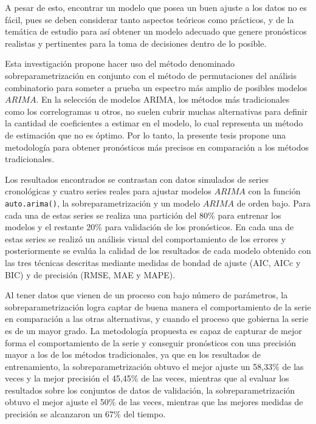 \documentclass[
]{article}
\begin{document}
A pesar de esto, encontrar un modelo que posea un buen ajuste a los
datos no es fácil, pues se deben considerar tanto aspectos teóricos como
prácticos, y de la temática de estudio para así obtener un modelo
adecuado que genere pronósticos realistas y pertinentes para la toma de
decisiones dentro de lo posible.

Esta investigación propone hacer uso del método denominado
sobreparametrización en conjunto con el método de permutaciones del
análisis combinatorio para someter a prueba un espectro más amplio de
posibles modelos \(ARIMA\). En la selección de modelos ARIMA, los
métodos más tradicionales como los correlogramas u otros, no suelen
cubrir muchas alternativas para definir la cantidad de coeficientes a
estimar en el modelo, lo cual representa un método de estimación que no
es óptimo. Por lo tanto, la presente tesis propone una metodología para
obtener pronósticos más precisos en comparación a los métodos
tradicionales.

Los resultados encontrados se contrastan con datos simulados de series
cronológicas y cuatro series reales para ajustar modelos \(ARIMA\) con
la función \texttt{auto.arima()}, la sobreparametrización y un modelo
\(ARIMA\) de orden bajo. Para cada una de estas series se realiza una
partición del 80\% para entrenar los modelos y el restante 20\% para
validación de los pronósticos. En cada una de estas series se realizó un
análisis visual del comportamiento de los errores y posteriormente se
evalúa la calidad de los resultados de cada modelo obtenido con las tres
técnicas descritas mediante medidas de bondad de ajuste (AIC, AICc y
BIC) y de precisión (RMSE, MAE y MAPE).

Al tener datos que vienen de un proceso con bajo número de parámetros,
la sobreparametrización logra captar de buena manera el comportamiento
de la serie en comparación a las otras alternativas, y cuando el proceso
que gobierna la serie es de un mayor grado. La metodología propuesta es
capaz de capturar de mejor forma el comportamiento de la serie y
conseguir pronósticos con una precisión mayor a los de los métodos
tradicionales, ya que en los resultados de entrenamiento, la
sobreparametrización obtuvo el mejor ajuste un 58,33\% de las veces y la
mejor precisión el 45,45\% de las veces, mientras que al evaluar los
resultados sobre los conjuntos de datos de validación, la
sobreparametrización obtuvo el mejor ajuste el 50\% de las veces,
mientras que las mejores medidas de precisión se alcanzaron un 67\% del
tiempo.
\end{document}
